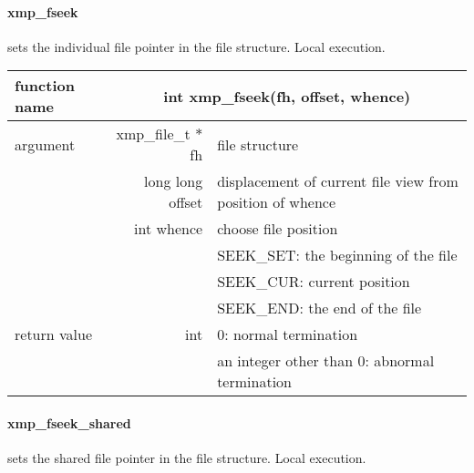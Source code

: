    \paragraph{xmp\_fseek} sets the individual file pointer in the file structure. Local execution.

   \begin{table}[h]
    \begin{center}
     \begin{tabular}{|l|r|p{70mm}|}
      \hline
      {\bf function name}  & \multicolumn{2}{c|}{\bf int xmp\_fseek(fh,
      offset, whence)}  \\ \hline \hline
      argument & xmp\_file\_t $*$fh & file structure \\ \cline{2-3}
      & long long offset & displacement of current file view from
	      position of whence \\ \cline{2-3}
      & int whence & choose file position \\
      &  & SEEK\_SET: the beginning of the file \\ 
      &  & SEEK\_CUR: current position \\ 
      &  & SEEK\_END: the end of the file \\ \hline
      return value & int & 0: normal termination \\
      &  & an integer other than 0: abnormal termination \\ \hline
      \end{tabular}
     \end{center}
    \label{tb:aaa}
   \end{table}

   \clearpage

   \paragraph{xmp\_fseek\_shared} sets the shared file pointer in the file structure. Local execution.

